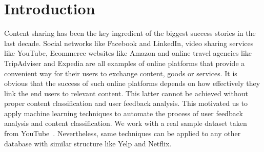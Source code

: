 \section{Introduction}
\label{intro}

Content sharing has been the key ingredient of the biggest success stories in the last decade. 
Social networks like Facebook and LinkedIn, video sharing services like YouTube, 
Ecommerce websites like Amazon and online travel agencies like TripAdviser and Expedia are all examples
of online platforms that provide a convenient way for their users to exchange content, goods or services.
It is obvious that the success of such online platforms depends on how effectively they link the end users to relevant content.
This latter cannot be achieved without proper content classification and user feedback analysis.
This motivated us to apply machine learning techniques to automate the process of user feedback analysis and content classification.
We work with a real sample dataset taken from YouTube~\cite{youtubedata}. Nevertheless, same techniques can be applied to any other database with similar structure like Yelp and Netflix.

